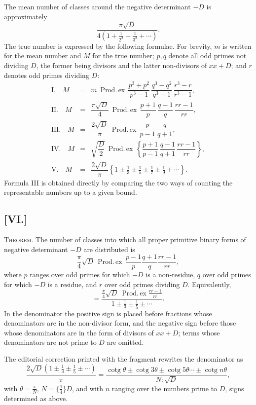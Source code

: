 \documentclass[12pt]{article}
\begin{document}
The mean number of classes around the negative determinant $-D$ is approximately
\[
\frac{\pi\sqrt D}{4\left(1+\frac1{2^2}+\frac1{3^2}+\cdots\right)}.
\]
The true number is expressed by the following formulae. For brevity, $m$ is written for the mean number and $M$ for the true number; $p,q$ denote all odd primes not dividing $D$, the former being divisors and the latter non-divisors of $xx+D$; and $r$ denotes odd primes dividing $D$:
\[
\begin{array}{rcl}
\text{I.}\quad
M&=&m\ \mathop{\mathrm{Prod.\,ex}}\,
\dfrac{p^3+p^2}{p^3-1}\,
\dfrac{q^3-q^2}{q^3-1}\,
\dfrac{r^3-r}{r^3-1},
\\[3mm]
\text{II.}\quad
M&=&\dfrac{\pi\sqrt D}{4}\ \mathop{\mathrm{Prod.\,ex}}\,
\dfrac{p+1}{p}\,
\dfrac{q-1}{q}\,
\dfrac{rr-1}{rr},
\\[3mm]
\text{III.}\quad
M&=&\dfrac{2\sqrt D}{\pi}\ \mathop{\mathrm{Prod.\,ex}}\,
\dfrac{p}{p-1}\,
\dfrac{q}{q+1},
\\[3mm]
\text{IV.}\quad
M&=&\sqrt{\dfrac{D}{2}}\ \mathop{\mathrm{Prod.\,ex}}\,
\left\{\dfrac{p+1}{p-1}\,
\dfrac{q-1}{q+1}\,
\dfrac{rr-1}{rr}\right\},
\\[3mm]
\text{V.}\quad
M&=&\dfrac{2\sqrt D}{\pi}
\left\{1\pm\frac13\pm\frac15\pm\frac17\pm\frac19+\cdots\right\}.
\end{array}
\]
Formula III is obtained directly by comparing the two ways of counting the representable numbers up to a given bound.

\subsection*{[VI.]}

\textsc{Theorem.} The number of classes into which all proper primitive binary forms of negative determinant $-D$ are distributed is
\[
\frac{\pi}{4}\sqrt D\,
\mathop{\mathrm{Prod.\,ex}}\,
\frac{p-1}{p}\frac{q+1}{q}\frac{rr-1}{rr},
\]
where $p$ ranges over odd primes for which $-D$ is a non-residue, $q$ over odd primes for which $-D$ is a residue, and $r$ over odd primes dividing $D$. Equivalently,
\[
=
\frac{\frac{\pi}{4}\sqrt D\ \mathop{\mathrm{Prod.\,ex}}\frac{rr-1}{rr}}
{1\pm\frac13\pm\frac15\pm\cdots}.
\]
In the denominator the positive sign is placed before fractions whose denominators are in the non-divisor form, and the negative sign before those whose denominators are in the form of divisors of $xx+D$; terms whose denominators are not prime to $D$ are omitted.

The editorial correction printed with the fragment rewrites the denominator as
\[
\frac{2\sqrt D\left(1\pm\frac13\pm\frac15\pm\cdots\right)}{\pi}
=
\frac{\operatorname{cotg}\theta\pm\operatorname{cotg}3\theta\pm\operatorname{cotg}5\theta\cdots\pm\operatorname{cotg}n\theta}{N:\sqrt D},
\]
with $\theta=\frac{\pi}{N}$, $N=\{\frac14\}D$, and with $n$ ranging over the numbers prime to $D$, signs determined as above.
\end{document}
